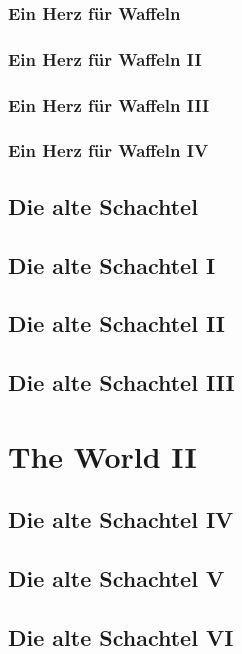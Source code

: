 \documentclass[ElegantBook]{Lilly}
\begin{document}
\section{Ein Herz für Waffeln}
\section{Ein Herz für Waffeln II}
\section{Ein Herz für Waffeln III}
\section{Ein Herz für Waffeln IV}

\chapter{Die alte Schachtel}
\chapter{Die alte Schachtel I}
\chapter{Die alte Schachtel II}
\chapter{Die alte Schachtel III}
\part{The World II}
\chapter{Die alte Schachtel IV}
\chapter{Die alte Schachtel V}
\chapter{Die alte Schachtel VI}
\end{document}
